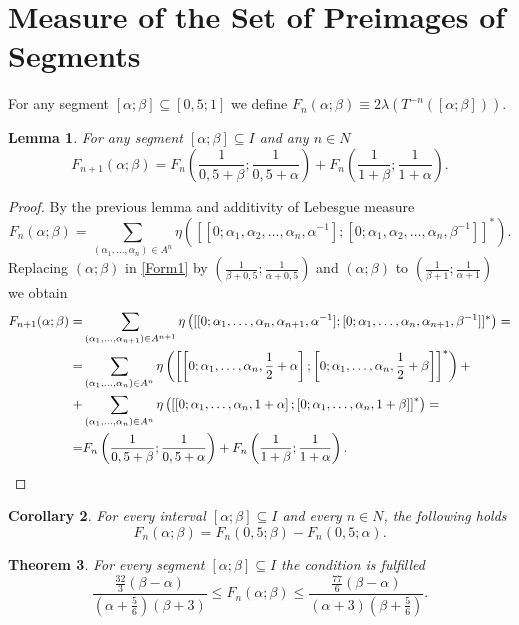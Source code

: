 \documentclass[11pt]{amsart}
\theoremstyle{plain}
\newtheorem{theorem}{Theorem}
\newtheorem{lemma}[theorem]{Lemma}
\newtheorem{corollary}[theorem]{Corollary}
\theoremstyle{remark}
\begin{document}
\section{Measure of the Set of Preimages of Segments}
 For any segment $[\alpha;\beta]\subseteq[0,5;1]$ we define   $F_n(\alpha;\beta)\equiv2\lambda\left(T^{-n}([\alpha;\beta])\right)$.
\begin{lemma}\label{lema1}
  For any segment $[\alpha;\beta]\subseteq I$ and any $n\in N$ 
  $$
  F_{n+1}(\alpha;\beta)=F_n \left( \frac{1}{0,5+\beta};\frac{1}{0,5+\alpha} \right)+F_n\left(\frac{1}{1+\beta};\frac{1}{1+\alpha}\right).
  $$
\end{lemma}
\begin{proof}
By the previous lemma and additivity of Lebesgue measure
    \begin{equation}\label{Form1}
    F_n(\alpha;\beta)=\sum_{(\alpha_1,...,\alpha_n)\in A^n}\eta\left([[0;\alpha_1,\alpha_2,\ldots,\alpha_n,\alpha^{-1}];
    [0;\alpha_1,\alpha_2,\ldots,\alpha_n,\beta^{-1}]]^* \right).
     \end{equation}
Replacing $(\alpha;\beta)$ in \eqref{Form1} by $\left( \frac{1}{\beta+0,5};\frac{1}{\alpha+0,5}\right)$ and $(\alpha;\beta)$ to $\left( \frac{1}{\beta+1};\frac{1}{\alpha+1}\right)$ we obtain
\begin{align*}
  F_{n+1}(\alpha;\beta)=&\sum_{(\alpha_1,...,\alpha_{n+1})\in A^{n+1}}\eta
 \left([[0;\alpha_1,\ldots,\alpha_n,\alpha_{n+1},\alpha^{-1}];
 [0;\alpha_1,\ldots,\alpha_n,\alpha_{n+1},\beta^{-1}]]^* \right)=\\
  =&\sum_{(\alpha_1,...,\alpha_n)\in A^n}\eta\left(\left
[\left[0;\alpha_1,\ldots,\alpha_n,\frac{1}{2}+\alpha\right];
\left[0;\alpha_1,\ldots,\alpha_n,\frac{1}{2}+\beta\right]\right]^* \right)+\\
+&\sum_{(\alpha_1,...,\alpha_n)\in A^n}\eta\left(\left[\left[0;\alpha_1,\ldots,\alpha_n,1+\alpha\right];\left[0;
\alpha_1,\ldots,\alpha_n,1+\beta\right]\right]^* \right)=\\
=&F_n\left(\frac{1}{0,5+\beta}; \frac{1}{0,5+\alpha}\right)+F_n\left(\frac{1}{1+\beta}; \frac{1}{1+\alpha}\right).
\qedhere
\end{align*}
 \end{proof}
\begin{corollary}
For every interval $[\alpha;\beta]\subseteq I$ and every
$n\in N$, the following holds
  $$
  F_{n}(\alpha;\beta)=F_n(0,5;\beta)-F_n(0,5;\alpha).
  $$ 
\end{corollary}
\begin{theorem}\label{lema2}
   For every segment $[\alpha;\beta]\subseteq I$ the condition is fulfilled
   $$
   \frac{\frac{32}{3}(\beta-\alpha)}{(\alpha+\frac{5}{6})(\beta+3)}\leq F_n(\alpha;\beta)\leq \frac{\frac{77}{6}(\beta-\alpha)}{(\alpha+3)(\beta+\frac{5}{6})}.
   $$
 \end{theorem}
\end{document}
